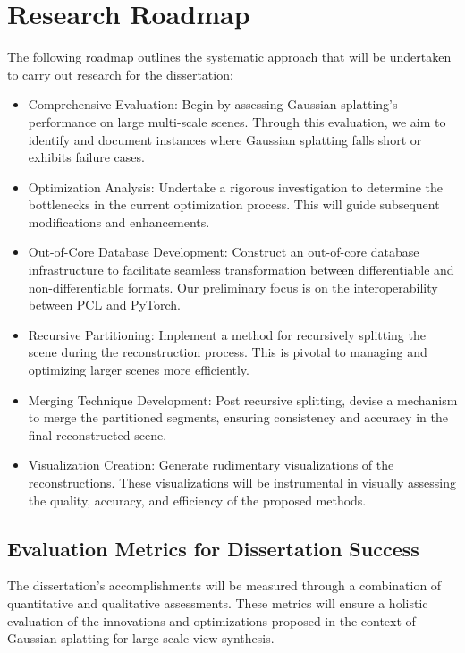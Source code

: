 \documentclass[logo,bsc,singlespacing,parskip]{infthesis}
\begin{document}
\chapter{Research Roadmap}

The following roadmap outlines the systematic approach that will be undertaken to carry out research for the dissertation:

\begin{itemize}
\item Comprehensive Evaluation: Begin by assessing Gaussian splatting's performance on large multi-scale scenes. Through this evaluation, we aim to identify and document instances where Gaussian splatting falls short or exhibits failure cases.

\item Optimization Analysis: Undertake a rigorous investigation to determine the bottlenecks in the current optimization process. This will guide subsequent modifications and enhancements.

\item Out-of-Core Database Development: Construct an out-of-core database infrastructure to facilitate seamless transformation between differentiable and non-differentiable formats. Our preliminary focus is on the interoperability between PCL and PyTorch.

\item Recursive Partitioning: Implement a method for recursively splitting the scene during the reconstruction process. This is pivotal to managing and optimizing larger scenes more efficiently.

\item Merging Technique Development: Post recursive splitting, devise a mechanism to merge the partitioned segments, ensuring consistency and accuracy in the final reconstructed scene.

\item Visualization Creation: Generate rudimentary visualizations of the reconstructions. These visualizations will be instrumental in visually assessing the quality, accuracy, and efficiency of the proposed methods.
\end{itemize}

\section{Evaluation Metrics for Dissertation Success}

The dissertation's accomplishments will be measured through a combination of quantitative and qualitative assessments. These metrics will ensure a holistic evaluation of the innovations and optimizations proposed in the context of Gaussian splatting for large-scale view synthesis.
\end{document}

